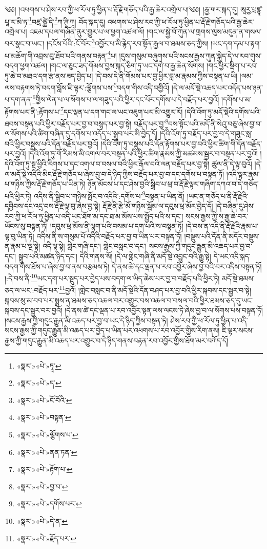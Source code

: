 ༄༅། །འཕགས་པ་ཤེས་རབ་ཀྱི་ཕ་རོལ་ཏུ་ཕྱིན་པ་རྡོ་རྗེ་གཅོད་པའི་རྒྱ་ཆེར་འགྲེལ་པ།༄༅། །རྒྱ་གར་སྐད་དུ། ཨཱརྱ་པྲཛྙཱ་པཱ་ར་མི་ཏ་\footnote{«སྣར་»«པེ་»ཏཱ་}བཛྲ་ཙྪེ་དི་\footnote{«སྣར་»«པེ་»ད་}ཀ་ཊཱི་ཀཱ། བོད་སྐད་དུ། འཕགས་པ་ཤེས་རབ་ཀྱི་ཕ་རོལ་ཏུ་ཕྱིན་པ་རྡོ་རྗེ་གཅོད་པའི་རྒྱ་ཆེར་འགྲེལ་པ། འཇམ་དཔལ་གཞོན་ནུར་གྱུར་པ་ལ་ཕྱག་འཚལ་ལོ། །གང་ལ་སྐྱེ་བོ་ཀུན་ལ་གྲགས་ལུས་མདུན་ན་གསལ་བར་སྣང་བ་ཡང་། །དངོས་པོའི་:ངོ་བོར་\footnote{«སྣར་»«པེ་»ངོ་བོའི་}འབྱོར་པ་མི་རྙེད་རབ་སྟོན་རྒྱལ་བ་ཐམས་ཅད་ཀྱིས། །ཡང་དག་དམ་པ་རྟག་པ་མཆོག་གི་འབྲས་བུ་ཐོབ་པའི་གནས་བརྟན་\footnote{«སྣར་»«པེ་»བསྟན་}པ། །དུས་གསུམ་བཞུགས་པའི་སངས་རྒྱས་ཀུན་སྐྱེད་དེ་ལ་རབ་གུས་བདག་ཕྱག་འཚལ། །གང་ལ་ཅུང་ཟད་གོམས་བྱས་སྐད་ཅིག་ཏུ་ཡང་དགེ་བ་རྒྱ་ཆེན་སོགས། །གང་ཕྱིར་སྡིག་པ་རབ་ཏུ་ཆེ་བ་མཐའ་དག་རྩ་ནས་ཟད་བྱེད་པ། །དེ་བས་དེ་ནི་གོམས་པར་བྱ་ཕྱིར་བླ་མ་རྣམས་ཀྱིས་བསྟན་པ་ཡི། །ལམ་ལས་བརྟགས་ཏེ་བདག་བློས་ཇི་ལྟར་:ལྕོགས་པས་\footnote{«སྣར་»«པེ་»ལྕོགས་པ་}བདག་གིས་འདི་བགྱིའོ། །དེ་ལ་མདོ་སྡེ་འཆད་པར་འདོད་པས་ཉན་པ་དག་ནན་\footnote{«སྣར་»«པེ་»ནན་ཏན་}གྱིས་ལེན་པ་ལ་སོགས་པ་ལ་གཟུད་པའི་ཕྱིར་དང་པོར་དགོས་པ་དེ་བརྗོད་པར་བྱའོ། །དགོས་པ་མ་རྟོགས་པར་ནི་:རྟོགས་པ་\footnote{«སྣར་»«པེ་»རྟོག་པ་}དང་ལྡན་པ་དག་གང་ལ་ཡང་འཇུག་པར་མི་འགྱུར་རོ། །དེའི་འོག་ཏུ་མདོ་སྡེའི་དགོས་པའི་ཐབས་བསྟན་པའི་ཕྱིར་བརྗོད་པར་བྱ་བ་བསྙད་པར་བྱ་སྟེ། བརྗོད་པར་བྱ་\footnote{«སྣར་»«པེ་»བྱ་བ་}བས་སྟོང་པའི་མདོ་ནི་སེའུ་བཅུ་ཞེས་བྱ་བ་ལ་སོགས་པའི་ཚིག་བཞིན་དུ་དགོས་པ་འདོད་པ་སྒྲུབ་པར་མི་བྱེད་དོ། །དེའི་འོག་ཏུ་བརྗོད་པར་བྱ་བ་དེ་གཟུང་སླ་བའི་ཕྱིར་བསྡུས་པའི་དོན་བརྗོད་པར་བྱའོ། །དེའི་འོག་ཏུ་བསྡུས་པའི་དོན་རྟོགས་པར་བྱ་བའི་ཕྱིར་ཚིག་གི་དོན་བརྗོད་པར་བྱའོ། །དེའི་འོག་ཏུ་གོ་རིམས་མི་འགལ་བར་བསྟན་པའི་ཕྱིར་ཚིག་རྣམས་ཀྱི་མཚམས་སྦྱར་བ་བསྟན་པར་བྱའོ། །དེའི་འོག་ཏུ་སྔ་ཕྱིའི་རིགས་པ་དང་འགལ་བ་བསལ་བའི་ཕྱིར་རྒོལ་བའི་ལན་བརྗོད་པར་བྱ་སྟེ། ཚུལ་ནི་དེ་ལྟ་བུའོ། །དེ་ལ་མདོ་སྡེ་འདིའི་མིང་རྡོ་རྗེ་གཅོད་པ་ཞེས་བྱ་བ་དེ་ཉིད་ཀྱིས་བརྗོད་པར་བྱ་བ་དང་དགོས་པ་བསྟན་ཏོ། །འདི་ལྟར་རྣམ་པ་གཉིས་ཀྱིས་རྡོ་རྗེ་གཅོད་པ་ཡིན་ཏེ། ཉོན་མོངས་པ་དང་ཤེས་བྱའི་སྒྲིབ་པ་ཕྲ་བ་རྡོ་རྗེ་ལྟར་གཞིག་དཀའ་བ་དེ་གཅོད་པའི་ཕྱིར་ཏེ། འདིས་ནི་སྒྲིབ་པ་གཉིས་སྤོང་བ་འདིའི་:དགོས་པ་\footnote{«སྣར་»«པེ་»དགོས་པར་}བསྟན་པ་ཡིན་ནོ། །ཡང་ན་གཅོད་པ་ནི་རྡོ་རྗེའི་དབྱིབས་དང་འདྲ་བས་རྡོ་རྗེ་ལྟ་བུ་ཞེས་བྱ་སྟེ། རྡོ་རྗེ་ནི་རྩེ་མོ་གཉིས་སྦོམ་ལ་དབུས་ཕྲ་མོར་བྱེད་དོ། །དེ་བཞིན་དུ་ཤེས་རབ་ཀྱི་ཕ་རོལ་ཏུ་ཕྱིན་པ་འདི་ཡང་ཐོག་མ་དང་ཐ་མ་མོས་པས་སྤྱོད་པའི་ས་དང་། སངས་རྒྱས་ཀྱི་ས་རྒྱ་ཆེ་བར་ཡོངས་སུ་བསྟན་ཏོ། །དབུས་ཕྲ་མོས་ནི་ལྷག་པའི་བསམ་པ་དག་པའི་ས་བསྟན་ཏོ། །དེ་བས་ན་འདི་ནི་རྡོ་རྗེའི་རྣམ་པ་ལྟ་བུ་ཡིན་ཏེ། འདིས་ནི་ས་གསུམ་པོ་འདིའི་བརྗོད་པར་བྱ་བ་ཡིན་པར་བསྟན་ཏོ། །བསྡུས་པའི་དོན་ནི་མདོར་བསྡུས་ན་རྣམ་པ་ལྔ་སྟེ། འདི་ལྟ་སྟེ། གླེང་གཞི་དང་། གླེང་བསླང་བ་དང་། སངས་རྒྱས་ཀྱི་གདུང་རྒྱུན་མི་འཆད་པར་བྱ་བ་དང་། སྒྲུབ་པའི་མཚན་ཉིད་དང་། དེའི་གནས་སོ། །དེ་ལ་གླེང་གཞི་ནི་མདོ་སྡེ་འབྱུང་བའི་རྒྱུ་སྟེ། དེ་ཡང་འདི་སྐད་བདག་གིས་ཐོས་པ་ཞེས་བྱ་བ་ནས་བརྩམས་ཏེ། དེ་ནས་ཚེ་དང་ལྡན་པ་རབ་འབྱོར་ཞེས་བྱ་བའི་བར་འདིས་བསྟན་ཏོ། །:དེ་བས་ནི་\footnote{«སྣར་»«པེ་»དེ་ན་}ཡང་དག་པར་སྡུད་པར་བྱེད་པས་བདག་ལ་ཡིད་ཆེས་པར་བྱ་བ་བརྗོད་པའི་ཕྱིར་ཏེ། མདོ་སྡེ་ཐམས་ཅད་ལ་ཡང་:བརྗོད་པར་\footnote{«སྣར་»«པེ་»རྗོད་པར་}བྱའོ། །གླེང་བསླང་བ་ནི་མདོ་སྡེའི་དོན་བཤད་པར་བྱ་བའི་ཕྱིར་སྐབས་དང་སྦྱར་བ་སྟེ། སྐབས་སུ་མ་བབ་པར་སྨྲས་ན་ཐམས་ཅད་འཆལ་བར་འགྱུར་བས་འཆལ་བ་བསལ་བའི་ཕྱིར་ཐམས་ཅད་དུ་ཡང་སྐབས་དང་སྦྱར་བར་བྱའོ། །དེ་ནས་ཚེ་དང་ལྡན་པ་རབ་འབྱོར་སྟན་ལས་ལངས་ཏེ་ཞེས་བྱ་བ་ལ་སོགས་པས་བསྟན་ཏོ། །སངས་རྒྱས་ཀྱི་གདུང་རྒྱུན་མི་འཆད་པར་བྱ་བ་ཡང་དེ་ཉིད་ཀྱིས་བསྟན་ཏེ། ཤེས་རབ་ཀྱི་ཕ་རོལ་ཏུ་ཕྱིན་པ་འདི་སངས་རྒྱས་ཀྱི་གདུང་རྒྱུན་མི་འཆད་པར་བྱེད་པ་ཡིན་པར་འཕགས་པ་རབ་འབྱོར་གྱིས་རིག་ནས། ཇི་ལྟར་སངས་རྒྱས་ཀྱི་གདུང་རྒྱུན་མི་འཆད་པར་འགྱུར་བ་དེ་ཉིད་གནས་བརྟན་རབ་འབྱོར་གྱིས་ཐོག་མར་བཀོད་དོ། 